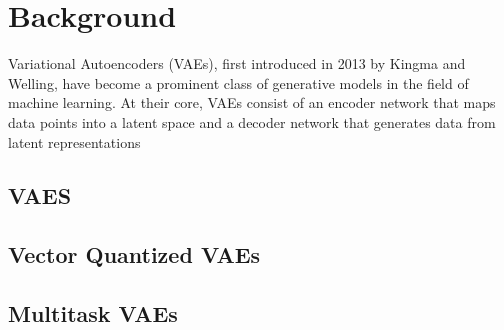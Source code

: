 \chapter{Background}
Variational Autoencoders (VAEs), first introduced in 2013 by Kingma and Welling\cite{kingma2022autoencoding}, have become a prominent class of generative models in the field of machine learning.  At their core, VAEs consist of an encoder network that maps data points into a latent space and a decoder network that generates data from latent representations

\section{VAES}
\section{Vector Quantized VAEs}
\section{Multitask VAEs}